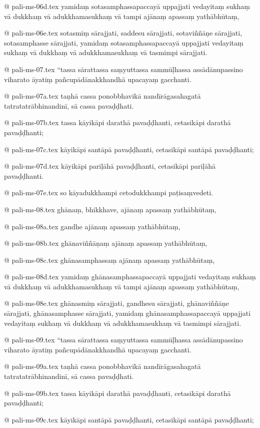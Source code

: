 @ pali-ms-06d.tex
yamidaṃ sotasamphassapaccayā uppajjati vedayitaṃ sukhaṃ vā dukkhaṃ vā adukkhamasukhaṃ vā tampi ajānaṃ apassaṃ yathābhūtaṃ,

@ pali-ms-06e.tex
sotasmiṃ sārajjati, saddesu sārajjati, sotaviññāṇe sārajjati, sotasamphasse sārajjati, yamidaṃ sotasamphassapaccayā uppajjati vedayitaṃ sukhaṃ vā dukkhaṃ vā adukkhamasukhaṃ vā tasmimpi sārajjati.

@ pali-ms-07.tex
“tassa sārattassa saṃyuttassa sammūḷhassa assādānupassino viharato āyatiṃ pañcupādānakkhandhā upacayaṃ gacchanti.

@ pali-ms-07a.tex
taṇhā cassa ponobbhavikā nandīrāgasahagatā tatratatrābhinandinī, sā cassa pavaḍḍhati.

@ pali-ms-07b.tex
tassa kāyikāpi darathā pavaḍḍhanti, cetasikāpi darathā pavaḍḍhanti;

@ pali-ms-07c.tex
kāyikāpi santāpā pavaḍḍhanti, cetasikāpi santāpā pavaḍḍhanti;

@ pali-ms-07d.tex
kāyikāpi pariḷāhā pavaḍḍhanti, cetasikāpi pariḷāhā pavaḍḍhanti.

@ pali-ms-07e.tex
so kāyadukkhampi cetodukkhampi paṭisaṃvedeti.

@ pali-ms-08.tex
ghānaṃ, bhikkhave, ajānaṃ apassaṃ yathābhūtaṃ,

@ pali-ms-08a.tex
gandhe ajānaṃ apassaṃ yathābhūtaṃ,

@ pali-ms-08b.tex
ghānaviññāṇaṃ ajānaṃ apassaṃ yathābhūtaṃ,

@ pali-ms-08c.tex
ghānasamphassaṃ ajānaṃ apassaṃ yathābhūtaṃ,

@ pali-ms-08d.tex
yamidaṃ ghānasamphassapaccayā uppajjati vedayitaṃ sukhaṃ vā dukkhaṃ vā adukkhamasukhaṃ vā tampi ajānaṃ apassaṃ yathābhūtaṃ,

@ pali-ms-08e.tex
ghānasmiṃ sārajjati, gandhesu sārajjati, ghānaviññāṇe sārajjati, ghānasamphasse sārajjati, yamidaṃ ghānasamphassapaccayā uppajjati vedayitaṃ sukhaṃ vā dukkhaṃ vā adukkhamasukhaṃ vā tasmimpi sārajjati.

@ pali-ms-09.tex
“tassa sārattassa saṃyuttassa sammūḷhassa assādānupassino viharato āyatiṃ pañcupādānakkhandhā upacayaṃ gacchanti.

@ pali-ms-09a.tex
taṇhā cassa ponobbhavikā nandīrāgasahagatā tatratatrābhinandinī, sā cassa pavaḍḍhati.

@ pali-ms-09b.tex
tassa kāyikāpi darathā pavaḍḍhanti, cetasikāpi darathā pavaḍḍhanti;

@ pali-ms-09c.tex
kāyikāpi santāpā pavaḍḍhanti, cetasikāpi santāpā pavaḍḍhanti;

